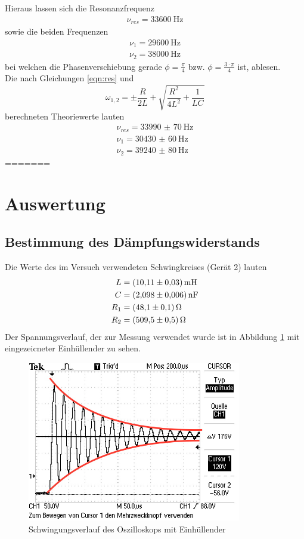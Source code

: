 \noindent Hieraus lassen sich die Resonanzfrequenz
\begin{align*}
  \nu_{res}= \SI{33600}{\hertz}
\end{align*}
sowie die beiden Frequenzen
\begin{align*}
  \nu_1 = \SI{29600}{\hertz} \\
  \nu_2 = \SI{38000}{\hertz}
\end{align*}
bei welchen die Phasenverschiebung gerade $\phi = \frac{\pi}{4}$ bzw. $\phi= \frac{3 \cdot \pi}{4}$
ist, ablesen. \\
\noindent Die nach Gleichungen \ref{eqn:res} und
\begin{equation}
  \omega_{1,2} = \pm \frac{R}{2L} + \sqrt{\frac{R^2}{4L^2} + \frac{1}{LC}}
\end{equation}
berechneten Theoriewerte lauten
\begin{align*}
  \nu_{res}= \SI{33990(70)}{\hertz} \\
  \nu_1 = \SI{30430(60)}{\hertz} \\
  \nu_2 = \SI{39240(80)}{\hertz}
\end{align*}
=======
\section{Auswertung}
\subsection{Bestimmung des Dämpfungswiderstands}
Die Werte des im Versuch verwendeten Schwingkreises (Gerät 2) lauten
\begin{align*}
  L &= \SI{10.11(3)}{\milli\henry} \\
  C &= \SI{2.098(6)}{\nano\farad} \\
  R_1 &= \SI{48.1 (1)}{\ohm} \\
  R_2 &= \SI{509.5(5)}{\ohm} \\
\end{align*}
\noindent Der Spannungsverlauf, der zur Messung verwendet wurde ist in Abbildung \ref{fig:fig1}
mit eingezeicneter Einhüllender zu sehen.
\begin{figure}[H]
  \centering
  \includegraphics[height=7cm]{Schwingung.JPG}
  \caption{Schwingungsverlauf des Oszilloskops mit Einhüllender}
  \label{fig:fig1}
\end{figure}

